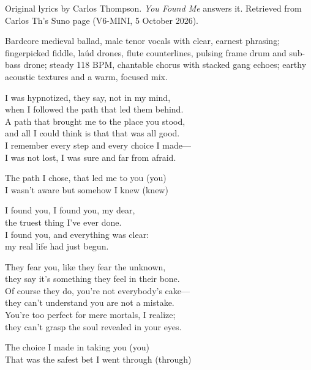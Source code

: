 
\begin{notes}
Original lyrics by Carlos Thompson. \emph{You Found Me} answers it. Retrieved from Carlos Th's Suno page (V6-MINI, 5 October 2026).
\end{notes}
\begin{style}
Bardcore medieval ballad, male tenor vocals with clear, earnest phrasing; fingerpicked fiddle, laúd drones, flute counterlines, pulsing frame drum and sub-bass drone; steady 118 BPM, chantable chorus with stacked gang echoes; earthy acoustic textures and a warm, focused mix.
\end{style}
\begin{lyrics}

I was hypnotized, they say, not in my mind,\\
when I followed the path that led them behind.\\
A path that brought me to the place you stood,\\
and all I could think is that that was all good.\\
I remember every step and every choice I made—\\
I was not lost, I was sure and far from afraid.

The path I chose, that led me to you (you)\\
I wasn't aware but somehow I knew (knew)

I found you, I found you, my dear,\\
the truest thing I've ever done.\\
I found you, and everything was clear:\\
my real life had just begun.

They fear you, like they fear the unknown,\\
they say it's something they feel in their bone.\\
Of course they do, you're not everybody's cake—\\
they can't understand you are not a mistake.\\
You're too perfect for mere mortals, I realize;\\
they can't grasp the soul revealed in your eyes.

The choice I made in taking you (you)\\
That was the safest bet I went through (through)


\end{lyrics}
